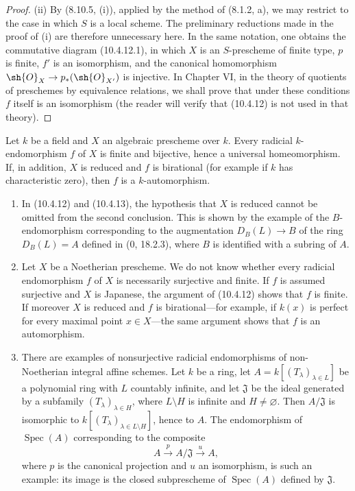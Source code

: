 \begin{proof}
\textup{(ii)} By (8.10.5, (i)), applied by the method of (8.1.2, a), we
may restrict to the case in which $S$ is a local scheme.  The preliminary
reductions made in the proof of (i) are therefore unnecessary here.  In
the same notation, one obtains the commutative diagram (10.4.12.1), in
which $X$ is an $S$-prescheme of finite type, $p$ is finite, $f'$ is an
isomorphism, and the canonical homomorphism
$\sh{O}_X\to p_*(\sh{O}_{X'})$ is injective.  In Chapter VI, in the
theory of quotients of preschemes by equivalence relations, we shall
prove that under these conditions $f$ itself is an isomorphism (the
reader will verify that (10.4.12) is not used in that theory).
\end{proof}

\begin{corollary}[10.4.13]
Let $k$ be a field and $X$ an algebraic prescheme over $k$.  Every
radicial $k$-endomorphism $f$ of $X$ is finite and bijective, hence a
universal homeomorphism.  If, in addition, $X$ is reduced and $f$ is
birational (for example if $k$ has characteristic zero), then $f$ is a
$k$-automorphism.
\end{corollary}

\begin{remark}[10.4.14]
\begin{enumerate}[label=\textup{(\roman*)}]
\item In (10.4.12) and (10.4.13), the hypothesis that $X$ is reduced
cannot be omitted from the second conclusion.  This is shown by the
example of the $B$-endomorphism corresponding to the augmentation
$D_B(L)\to B$ of the ring $D_B(L)=A$ defined in (0, 18.2.3), where $B$
is identified with a subring of $A$.

\item Let $X$ be a Noetherian prescheme.  We do not know whether every
radicial endomorphism $f$ of $X$ is necessarily surjective and finite.
If $f$ is assumed surjective and $X$ is Japanese, the argument of
(10.4.12) shows that $f$ is finite.  If moreover $X$ is reduced and
$f$ is birational---for example, if $k(x)$ is perfect for every maximal
point $x\in X$---the same argument shows that $f$ is an automorphism.

\item There are examples of nonsurjective radicial endomorphisms of
non-Noetherian integral affine schemes.  Let $k$ be a ring, let
$A=k[(T_\lambda)_{\lambda\in L}]$ be a polynomial ring with $L$
countably infinite, and let $\mathfrak J$ be the ideal generated by a
subfamily $(T_\lambda)_{\lambda\in H}$, where $L\setminus H$ is infinite
and $H\neq\varnothing$.  Then $A/\mathfrak J$ is isomorphic to
$k[(T_\lambda)_{\lambda\in L\setminus H}]$, hence to $A$.  The
endomorphism of $\operatorname{Spec}(A)$ corresponding to the composite
\[
 A\xrightarrow{p}A/\mathfrak J\xrightarrow{u}A,
\]
where $p$ is the canonical projection and $u$ an isomorphism, is such
an example: its image is the closed subprescheme of
$\operatorname{Spec}(A)$ defined by $\mathfrak J$.
\end{enumerate}
\end{remark}

\EGAIVErrataThirtyTwoThroughFiftyThree
